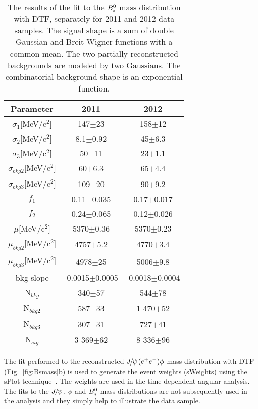 \begin{table}[htb]
  \caption{
    The results of the fit to the ${{B}^0_{s}}$ mass distribution with DTF, separately for 2011 and 2012 data samples. The signal shape is a sum of double Gaussian and Breit-Wigner functions with a common mean. The two partially reconstructed backgrounds are modeled by two Gaussians. The combinatorial background shape is an exponential function.
}
\small{
\begin{center} \begin{tabular}{|c|c|c|}
    \hline
   Parameter & 2011 & 2012  \\
    \hline
  $\sigma_{1}$[MeV/c$^{2}$] & 147$\pm$23 &158$\pm$12\\
  $\sigma_{2}$[MeV/c$^{2}$] & 8.1$\pm$0.92 &45$\pm$6.3\\
  $\sigma_{3}$[MeV/c$^{2}$] & 50$\pm$11 &23$\pm$1.1\\
  $\sigma_{bkg2}$[MeV/c$^{2}$] & 60$\pm$6.3 &65$\pm$4.4\\
  $\sigma_{bkg3}$[MeV/c$^{2}$] & 109$\pm$20 &90$\pm$9.2\\
  $f_{1}$ & 0.11$\pm$0.035 &0.17$\pm$0.017\\
  $f_{2}$ & 0.24$\pm$0.065 &0.12$\pm$0.026\\
  $\mu$[MeV/c$^{2}$] & 5370$\pm$0.36 &5370$\pm$0.23\\
  $\mu_{bkg2}$[MeV/c$^{2}$] & 4757$\pm$5.2 & 4770$\pm$3.4\\
  $\mu_{bkg3}$[MeV/c$^{2}$] & 4978$\pm$25 & 5006$\pm$9.8\\
  bkg slope & -0.0015$\pm$0.0005 & -0.0018$\pm$0.0004\\
  N$_{bkg}$ & 340$\pm$57 & 544$\pm$78\\
  N$_{bkg2}$ & 587$\pm$33 & 1 470$\pm$52\\
  N$_{bkg3}$ & 307$\pm$31 & 727$\pm$41\\
  N$_{sig}$ & 3 369$\pm$62 & 8 336$\pm$96\\
  \hline
    \end{tabular}\end{center}
  }
\label{tab:BsDTFTable}
\end{table}

The fit performed to the reconstructed ${{J\mskip -3mu/\mskip -2mu\psi\mskip 2mu}}({e^+e^-})\phi$ mass distribution with DTF (Fig.~\ref{fig:Bsmass}b) is used to generate the event weights (sWeights) using the sPlot technique~\cite{Pivk:2004ty}. The weights are used in the time dependent angular analysis. The fits to the ${{J\mskip -3mu/\mskip -2mu\psi\mskip 2mu}}$, $\phi$ and ${{B}^0_{s}}$ mass distributions are not subsequently used in the analysis and they simply help to illustrate the data sample.


